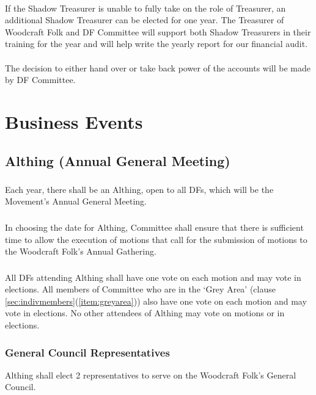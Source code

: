 \documentclass[a4paper, 11pt]{report}
\begin{document}
\paragraph{} If the Shadow Treasurer is unable to fully take on the role of Treasurer, an additional Shadow Treasurer can be elected for one year. The Treasurer of Woodcraft Folk and DF Committee will support both Shadow Treasurers in their training for the year and will help write the yearly report for our financial audit.
\paragraph{} The decision to either hand over or take back power of the accounts will be made by DF Committee.

\section{Business Events}
\label{sec:business}
\subsection{Althing (Annual General Meeting)}
\label{sec:althing}
\subsubsection{}
Each year, there shall be an Althing, open to all DFs, which will be the Movement's Annual General Meeting.
\subsubsection{}
In choosing the date for Althing, Committee shall ensure that there is sufficient time to allow the execution of motions that call for the submission of motions to the Woodcraft Folk's Annual Gathering.
\subsubsection{}
All DFs attending Althing shall have one vote on each motion and may vote in elections. All members of Committee  who are in the `Grey Area' (clause \ref{sec:indivmembers}(\ref{item:greyarea})) also have one vote on each motion and may vote in elections. No other attendees of Althing may vote on motions or in elections.
\subsubsection{General Council Representatives}
Althing shall elect 2 representatives to serve on the Woodcraft Folk's General Council.
\end{document}
